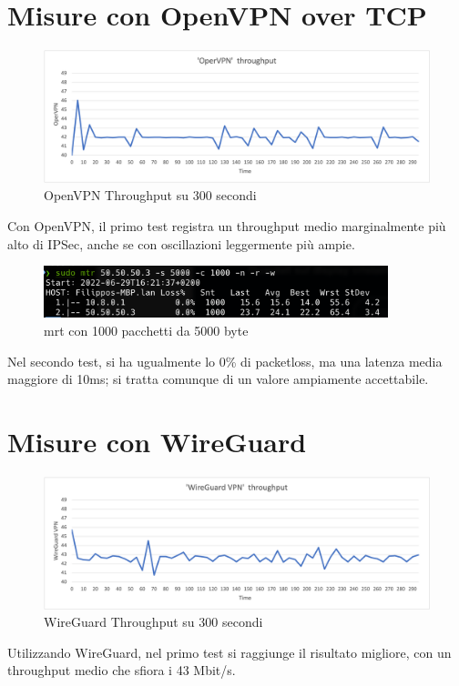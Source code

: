 \section{Misure con OpenVPN over TCP}
\begin{figure}[ht]
    \centering
    \includegraphics[width=12cm]{figure/vpn_thr.png-3.png}
    \caption{OpenVPN Throughput su 300 secondi}
\end{figure}
Con OpenVPN, il primo test registra un throughput medio marginalmente più alto di IPSec, anche se con oscillazioni leggermente più ampie.

\begin{figure}[ht]
    \centering
    \includegraphics[width=10cm]{figure/mtr_16min_ovpn.png}
    \caption{mrt con 1000 pacchetti da 5000 byte}
\end{figure}
Nel secondo test, si ha ugualmente lo 0\% di packetloss, ma una latenza media maggiore di 10ms; si tratta comunque di un valore ampiamente accettabile.


\section{Misure con WireGuard}
\begin{figure}[ht]
    \centering
    \includegraphics[width=12cm]{figure/vpn_thr.png-4.png}
    \caption{WireGuard Throughput su 300 secondi}
\end{figure}
Utilizzando WireGuard, nel primo test si raggiunge il risultato migliore, con un throughput medio che sfiora i 43 Mbit/s.

